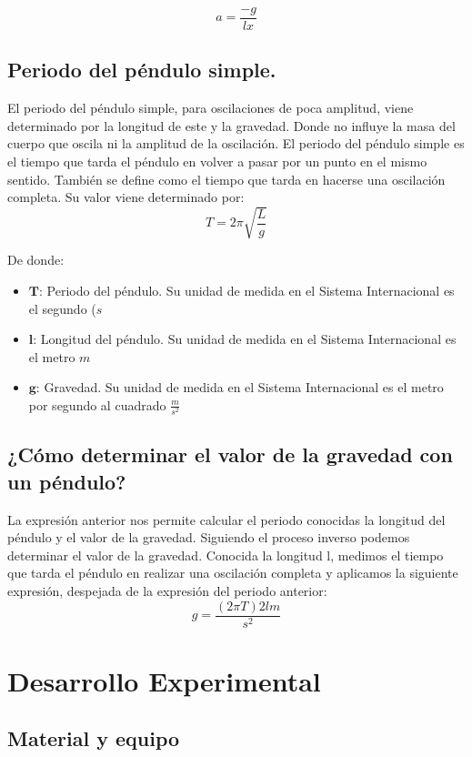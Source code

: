\documentclass[11pt]{article}
\begin{document}
\begin{multicols}{2}
$$a=\frac{-g}{l x}$$

	\subsection{Periodo del péndulo simple.}
	El periodo del péndulo simple, para oscilaciones de poca amplitud, viene determinado por la longitud de este y la gravedad. Donde no influye la masa del cuerpo que oscila ni la amplitud de la oscilación.
El periodo del péndulo simple es el tiempo que tarda el péndulo en volver a pasar por un punto en el mismo sentido. También se define como el tiempo que tarda en hacerse una oscilación completa. Su valor viene determinado por:
$$T=2\pi \sqrt{\frac{L}{g}}$$

De donde:
\begin{itemize}
	\item $\displaystyle{\textbf{T}}$: Periodo del péndulo. Su unidad de medida en el Sistema Internacional es el segundo ($s$\\
	\item $\displaystyle{\textbf{l}}$: Longitud del péndulo. Su unidad de medida en el Sistema Internacional es el metro $m$\\
	\item $\displaystyle{\textbf{g}}$: Gravedad. Su unidad de medida en el Sistema Internacional es el metro por segundo al cuadrado $\frac{m}{s^2}$
\end{itemize}

	\subsection{¿Cómo determinar el valor de la gravedad con un péndulo?}
La expresión anterior nos permite calcular el periodo conocidas la longitud del péndulo y el valor de la gravedad. Siguiendo el proceso inverso podemos determinar el valor de la gravedad. Conocida la longitud l, medimos el tiempo que tarda el péndulo en realizar una oscilación completa y aplicamos la siguiente expresión, despejada de la expresión del periodo anterior:
$$g=\frac{(2\pi T)2l m}{s^2}$$


\section{Desarrollo Experimental}

	\subsection{Material y equipo}
	\begin{itemize}


\end{itemize}
\end{multicols}
\end{document}
